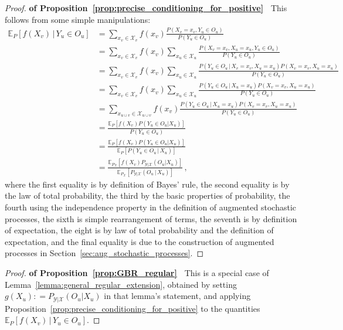 \documentclass[twoside,11pt]{article}
\newcommand{\states}{\mathcal{X}}
\newcommand{\observs}{\mathcal{Y}}
\newcommand{\coloneqq}{:\!=}
\begin{document}
\begin{proof}{\bf of Proposition~\ref{prop:precise_conditioning_for_positive}~}
This follows from some simple manipulations:
\begin{align*}
\mathbb{E}_P[f(X_v)\,\vert\,Y_u\in O_u] &= \sum_{x_v\in\states_v} f(x_v)\frac{P(X_v=x_v, Y_u\in O_u)}{P(Y_u\in O_u)} \\
 &= \sum_{x_v\in\states_v} f(x_v)\sum_{x_u\in\states_u}\frac{P(X_v=x_v, X_u=x_u, Y_u\in O_u)}{P(Y_u\in O_u)} \\
 &= \sum_{x_v\in\states_v} f(x_v)\sum_{x_u\in\states_u}\frac{P(Y_u\in O_u\,\vert\,X_v=x_v, X_u=x_u)P(X_v=x_v, X_u=x_u)}{P(Y_u\in O_u)} \\
 &= \sum_{x_v\in\states_v} f(x_v)\sum_{x_u\in\states_u}\frac{P(Y_u\in O_u\,\vert\,X_u=x_u)P(X_v=x_v, X_u=x_u)}{P(Y_u\in O_u)} \\
 &= \sum_{x_{u\cup v}\in\states_{u\cup v}} f(x_v)\frac{P(Y_u\in O_u\,\vert\,X_u=x_u)P(X_v=x_v, X_u=x_u)}{P(Y_u\in O_u)} \\
 &= \frac{\mathbb{E}_P[f(X_v)P(Y_u\in O_u\vert X_u)]}{P(Y_u\in O_u)} \\
 &= \frac{\mathbb{E}_P[f(X_v)P(Y_u\in O_u\vert X_u)]}{\mathbb{E}_P[P(Y_u\in O_u\,\vert\,X_u)]} \\
  &= \frac{\mathbb{E}_{P_\states}[f(X_v)P_{\observs\vert\states}(O_u\vert X_u)]}{\mathbb{E}_{P_\states}[P_{\observs\vert\states}(O_u\,\vert\,X_u)]} \,,
\end{align*}
where the first equality is by definition of Bayes' rule, the second equality is by the law of total probability, the third by the basic properties of probability, the fourth using the independence property in the definition of augmented stochastic processes, the sixth is simple rearrangement of terms, the seventh is by definition of expectation, the eight is by law of total probability and the definition of expectation, and the final equality is due to the construction of augmented processes in Section~\ref{sec:aug_stochastic_processes}.

\end{proof}


\begin{proof}{\bf of Proposition~\ref{prop:GBR_regular}~}
This is a special case of Lemma~\ref{lemma:general_regular_extension}, obtained by setting $g(X_u)\coloneqq P_{\observs\vert\states}(O_u\vert X_u)$ in that lemma's statement, and applying Proposition~\ref{prop:precise_conditioning_for_positive} to the quantities $\mathbb{E}_P[f(X_v)\,\vert\,Y_u\in O_u]$.
\end{proof}
\end{document}
